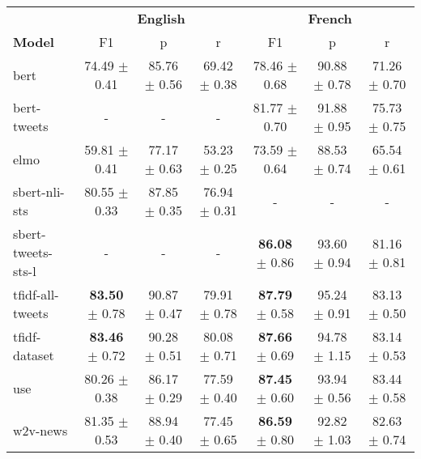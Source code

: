 \begin{tabular}{|l|ccc|ccc|}
\hline
                           &\multicolumn{3}{c}{\textbf{English}}&\multicolumn{3}{|c|}{\textbf{French}}\\
\cline{2-7}
        \textbf{Model} &              F1 &               p &               r &              F1 &               p &               r \\
\hline
               bert  &  74.49 $\pm$ 0.41 &  85.76 $\pm$ 0.56 &  69.42 $\pm$ 0.38 &  78.46 $\pm$ 0.68 &  90.88 $\pm$ 0.78 &  71.26 $\pm$ 0.70 \\
        bert-tweets  &                 - &                 - &                 - &  81.77 $\pm$ 0.70 &  91.88 $\pm$ 0.95 &  75.73 $\pm$ 0.75 \\
               elmo  &  59.81 $\pm$ 0.41 &  77.17 $\pm$ 0.63 &  53.23 $\pm$ 0.25 &  73.59 $\pm$ 0.64 &  88.53 $\pm$ 0.74 &  65.54 $\pm$ 0.61 \\
      sbert-nli-sts  &  80.55 $\pm$ 0.33 &  87.85 $\pm$ 0.35 &  76.94 $\pm$ 0.31 &                 - &                 - &                 - \\
 sbert-tweets-sts-l  &                 - &                 - &                 - &  \textbf{86.08}
                                                                                          $\pm$ 0.86 &  93.60 $\pm$ 0.94 &  81.16 $\pm$ 0.81 \\
   tfidf-all-tweets  &  \textbf{83.50}
                              $\pm$ 0.78 &  90.87 $\pm$ 0.47 &  79.91 $\pm$ 0.78 &  \textbf{87.79}
                                                                                          $\pm$ 0.58 &  95.24 $\pm$ 0.91 &  83.13 $\pm$ 0.50 \\
      tfidf-dataset  &  \textbf{83.46}
                              $\pm$ 0.72 &  90.28 $\pm$ 0.51 &  80.08 $\pm$ 0.71 &  \textbf{87.66}
                                                                                          $\pm$ 0.69 &  94.78 $\pm$ 1.15 &  83.14 $\pm$ 0.53 \\
                use  &  80.26 $\pm$ 0.38 &  86.17 $\pm$ 0.29 &  77.59 $\pm$ 0.40 &  \textbf{87.45}
                                                                                          $\pm$ 0.60 &  93.94 $\pm$ 0.56 &  83.44 $\pm$ 0.58 \\
           w2v-news  &  81.35 $\pm$ 0.53 &  88.94 $\pm$ 0.40 &  77.45 $\pm$ 0.65 &  \textbf{86.59}
                                                                                          $\pm$ 0.80 &  92.82 $\pm$ 1.03 &  82.63 $\pm$ 0.74 \\

\end{tabular}
